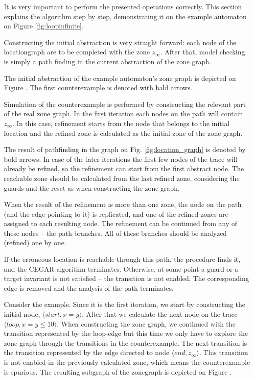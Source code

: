 It is very important to perform the presented operations correctly. This section explains the algorithm step by step, demonstrating it on the example automaton on Figure \ref{fig:loopinfinite}.

Constructing the initial abstraction is very straight forward: each node of the locationgraph are to be completed with the zone $z_\infty$. After that, model checking is simply a path finding in the current abstraction of the zone graph.

\begin{example}
	The initial abstraction of the example automaton's zone graph is depicted on Figure . The first counterexample is denoted with bald arrows.
\end{example}

Simulation of the counterexample is performed by constructing the relevant part of the real zone graph. In the first iteration each nodes on the path will contain $z_\infty$. In this case, refinement starts from the node that belongs to the initial location and the refined zone is calculated as the initial zone of the zone graph.

The result of pathfinding in the graph on Fig. \ref{fig:location_graph} is denoted by bold arrows. In case of the later iterations the first few nodes of the
trace will already be refined, so the refinement can start from the first
abstract node. The reachable zone should be calculated from the last refined zone,
considering the guards and the reset as when constructing the zone graph.

When the result of the refinement is more than one zone, the node on the path (and the edge pointing
to it) is replicated, and one of the refined zones are assigned
to each resulting node. The refinement can be continued from any of these nodes -- the path branches.
All of these branches should be analyzed (refined) one by one.

If the erroneous location is reachable through this path, the procedure finds it,
and the CEGAR algorithm terminates. Otherwise, at some point a guard or a target invariant
is not satisfied -- the transition is not enabled. The corresponding edge is removed and the analysis of the path terminates.

\begin{example}
	Consider the example. Since it is the first iteration, we start by constructing the initial node, $\langle start, x=y \rangle$. After that we calculate the next node on the trace $\langle loop, x=y \leq 10 \rangle$. When constructing the zone graph, we continued with the transition represented by the loop-edge but this time we only have to explore the zone graph through the transitions in the counterexample. The next transition is the transition represented by the edge directed to node $\langle end, z_\infty \rangle$. This transition is not enabled in the previously calculated zone, which means the counterexample is spurious. The resulting subgraph of the zonegraph is depicted on Figure .
\end{example}


